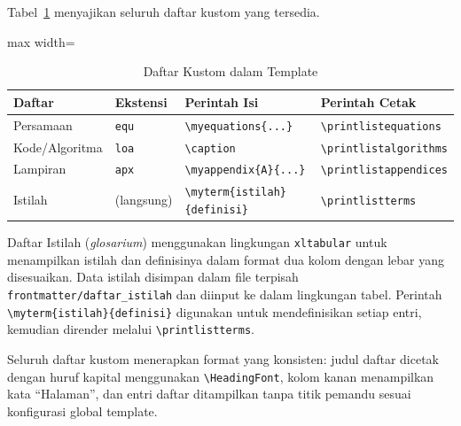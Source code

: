 Tabel~\ref{tab:daftar-kustom} menyajikan seluruh daftar kustom yang tersedia.

\begin{table}[h]
  \centering
  \caption{Daftar Kustom dalam Template}
  \label{tab:daftar-kustom}
  \begin{adjustbox}{max width=\textwidth}
  \begin{tabular}{lllp{4cm}}
    \toprule
    \textbf{Daftar} & \textbf{Ekstensi} & \textbf{Perintah Isi} & \textbf{Perintah Cetak} \\
    \midrule
    Persamaan & \texttt{equ} & \texttt{\textbackslash myequations\{...\}} & \texttt{\textbackslash printlistequations} \\
    Kode/Algoritma & \texttt{loa} & \texttt{\textbackslash caption} & \texttt{\textbackslash printlistalgorithms} \\
    Lampiran & \texttt{apx} & \texttt{\textbackslash myappendix\{A\}\{...\}} & \texttt{\textbackslash printlistappendices} \\
    Istilah & (langsung) & \texttt{\textbackslash myterm\{istilah\}\{definisi\}} & \texttt{\textbackslash printlistterms} \\
    \bottomrule
  \end{tabular}
  \end{adjustbox}
\end{table}

Daftar Istilah (\textit{glosarium}) menggunakan lingkungan \texttt{xltabular} untuk menampilkan istilah dan definisinya dalam format dua kolom dengan lebar yang disesuaikan. Data istilah disimpan dalam file terpisah \texttt{frontmatter/daftar\_istilah} dan diinput ke dalam lingkungan tabel. Perintah \texttt{\textbackslash myterm\{istilah\}\{definisi\}} digunakan untuk mendefinisikan setiap entri, kemudian dirender melalui \texttt{\textbackslash printlistterms}.

Seluruh daftar kustom menerapkan format yang konsisten: judul daftar dicetak dengan huruf kapital menggunakan \texttt{\textbackslash HeadingFont}, kolom kanan menampilkan kata ``Halaman'', dan entri daftar ditampilkan tanpa titik pemandu sesuai konfigurasi global template.
